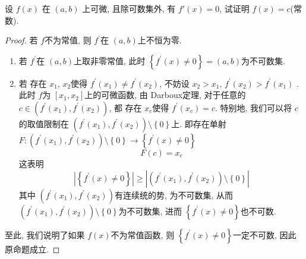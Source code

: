 \documentclass[../main.tex]{subfiles}
\begin{document}
\begin{exercise}{}{}
    设 $f(x)$ 在 $(a,b)$ 上可微, 且除可数集外, 有 $f'(x)=0$, 试证明 $f(x)=c$(常数).
\end{exercise}

\begin{proof}
    若 \(  f  \)不为常值, 则 \(  f^{\prime}   \)在 \(  \left( a,b \right)   \)上不恒为零.
    \begin{enumerate}
        \item 若 \(  f^{\prime}   \)在 \(  (a,b)  \)上取非零常值, 此时 \(  \left\{ f^{\prime} \left( x \right)\neq 0  \right\}= \left( a,b \right)   \)为不可数集.
        \item 若 存在 \(  x_1  \), \(  x_2  \)使得 \(  f^{\prime} \left( x_1 \right)\neq f^{\prime} \left( x_2 \right)    \), 不妨设 \(  x_2> x_1  \), \(  f^{\prime} \left( x_2 \right)> f^{\prime} \left( x_1 \right)    \) .       此时 \(  f  \)为 \(  \left[ x_1,x_2 \right]   \)上的可微函数,   由 Darboux定理, 对于任意的 \(  c \in \left( f^{\prime} \left( x_1 \right),f^{\prime} \left( x_2 \right)   \right)   \),  都 存在 \(  x_{c}  \)使得 \(  f^{\prime} \left( x_{c} \right)= c  \). 特别地, 我们可以将 \(  c  \)的取值限制在 \(  \left( f^{\prime} \left( x_1 \right),f^{\prime} \left( x_2 \right)   \right)\setminus \left\{ 0 \right\}   \)上. 即存在单射 \(  F: \left( f^{\prime} \left( x_1 \right),f^{\prime} \left( x_2 \right)   \right)\setminus \left\{ 0 \right\}\to \left\{ f^{\prime} \left( x \right)\neq 0  \right\}   \) \[
        F\left( c \right)= x_{c} 
        \]   这表明 \[
        \left| \left\{ f^{\prime} \left( x \right)\neq 0  \right\} \right|\ge \left| \left( f^{\prime} \left( x_1 \right),f^{\prime} \left( x_2 \right)   \right)\setminus \left\{ 0 \right\}  \right|  
        \]其中 \(  \left( f^{\prime} \left( x_1 \right),f^{\prime} \left( x_2 \right)   \right)   \)有连续统的势, 为不可数集, 从而 \(  \left( f^{\prime} \left( x_1 \right),f^{\prime} \left( x_2 \right)   \right) \setminus \left\{ 0 \right\}  \)为不可数集, 进而 \(  \left\{ f^{\prime} \left( x \right)\neq 0  \right\}  \)也不可数.   
    \end{enumerate}
       至此, 我们说明了如果 \(  f\left( x \right)   \)不为常值函数, 则 \(  \left\{ f^{\prime} \left( x \right)\neq 0  \right\}  \)一定不可数, 因此原命题成立.  
\end{proof}
\end{document}
